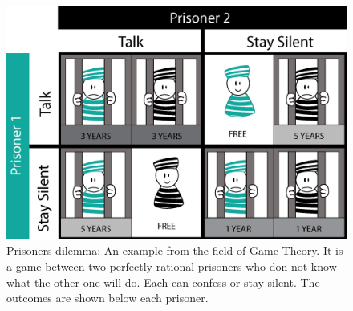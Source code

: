 \begin{figure}[hbtp]
\centering
\includegraphics[scale=0.6]{Images/PrisDilemma}
\caption{Prisoners dilemma: An example from the field of Game Theory. It is a game between two perfectly rational prisoners who don not know what the other one will do. Each can confess or stay silent. The outcomes are shown below each prisoner. }
\label{Prison}
\end{figure}




